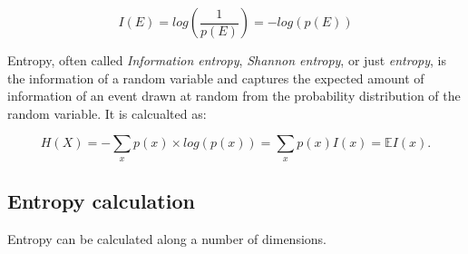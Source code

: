 \begin{equation}
    I(E) = log\left(\frac{1}{p(E)}\right) = -log(p(E))
\end{equation}

Entropy, often called \textit{Information entropy}, \textit{Shannon entropy},
or just \textit{entropy}, is the information of a random variable and captures
the expected amount of information of an event drawn at random from the
probability distribution of the random variable. It is calcualted as:

\begin{equation}
    H(X) = -\sum_x p(x) \times log(p(x)) = \sum_x p(x)I(x) = \mathbb{E} I(x).
\end{equation}







\subsection{Entropy calculation}%
\label{sub:entropy_calculation}


Entropy can be calculated along a number of dimensions.

